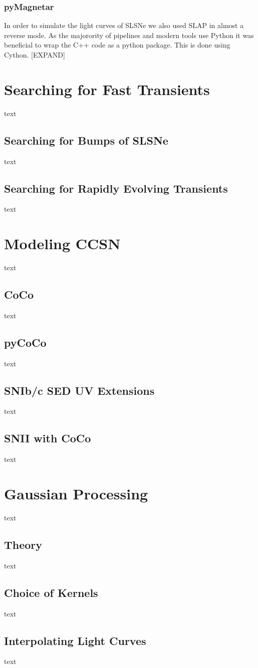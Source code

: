 \subsubsection{pyMagnetar}
In order to simulate the light curves of SLSNe we also used SLAP in almost a reverse mode. As the majorority of pipelines and modern tools use Python it was beneficial to wrap the C++ code as a python package. This is done using Cython. [EXPAND]

\section{Searching for Fast Transients}
text
\subsection{Searching for Bumps of SLSNe}
text
\subsection{Searching for Rapidly Evolving Transients}
text

\section{Modeling CCSN}
text
\subsection{CoCo}
text
\subsection{pyCoCo}
text
\subsection{SNIb/c SED UV Extensions}
text
\subsection{SNII with CoCo}
text

\section{Gaussian Processing}
text
\subsection{Theory}
text
\subsection{Choice of Kernels}
text
\subsection{Interpolating Light Curves}
text

